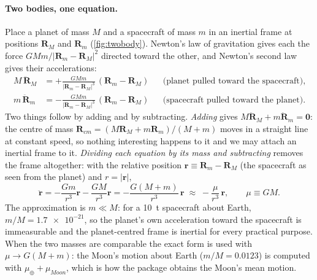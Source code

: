 \documentclass[11pt,letterpaper,oneside]{report}
\newcommand{\bv}[1]{\bm{#1}}
\begin{document}
\paragraph{Two bodies, one equation.} Place a planet of mass $M$ and a spacecraft of mass $m$ in
an inertial frame at positions $\bv R_M$ and $\bv R_m$ (\cref{fig:twobody}). Newton's law of
gravitation gives each the force $GMm/|\bv R_m-\bv R_M|^2$ directed toward the other, and
Newton's second law gives their accelerations:
\begin{align*}
  M\,\ddot{\bv R}_M &= +\frac{GMm}{|\bv R_m-\bv R_M|^3}\,(\bv R_m-\bv R_M) && \text{(planet pulled toward the spacecraft)},\\
  m\,\ddot{\bv R}_m &= -\frac{GMm}{|\bv R_m-\bv R_M|^3}\,(\bv R_m-\bv R_M) && \text{(spacecraft pulled toward the planet)}.
\end{align*}
Two things follow by adding and by subtracting. \emph{Adding} gives $M\ddot{\bv R}_M+m\ddot{\bv R}_m=\bv 0$:
the centre of mass $\bv R_{cm}=(M\bv R_M+m\bv R_m)/(M+m)$ moves in a straight line at constant
speed, so nothing interesting happens to it and we may attach an inertial frame to it.
\emph{Dividing each equation by its mass and subtracting} removes the frame altogether: with the
relative position $\bv r\equiv\bv R_m-\bv R_M$ (the spacecraft as seen from the planet) and $r=|\bv r|$,
\begin{equation}
  \ddot{\bv r} = -\frac{Gm}{r^3}\bv r-\frac{GM}{r^3}\bv r = -\frac{G(M+m)}{r^3}\,\bv r \;\approx\; -\frac{\mu}{r^3}\,\bv r,\qquad \mu\equiv GM .
  \label{eq:eom}
\end{equation}
The approximation is $m\ll M$: for a \SI{10}{t} spacecraft about Earth, $m/M=\num{1.7e-21}$, so
the planet's own acceleration toward the spacecraft is immeasurable and the planet-centred frame
is inertial for every practical purpose. When the two masses are comparable the exact form is
used with $\mu\to G(M+m)$: the Moon's motion about Earth ($m/M=0.0123$) is computed with
$\mu_\oplus+\mu_{Moon}$, which is how the package obtains the Moon's mean motion.
\end{document}
